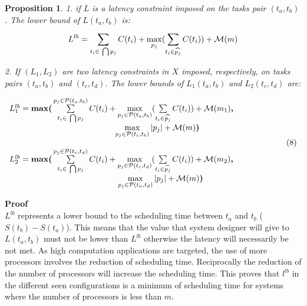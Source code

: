 \documentclass{ijcaArticle}
\newtheorem{Proposition}{Proposition}
\begin{document}
 \begin{Proposition}\label{lower_bound}
1.  if $L$ is a latency constraint imposed on the tasks pair $(t_{a},t_{b})$. The lower bound of $L(t_{a}, t_{b})$  is: 
\begin{equation}\label{eq_clus_sim_cond_multi_4} 
L^{l b}= \sum\limits_{t_i \in \ \bigcap p_j }^{} C(t_i) +  \max\limits_{{p_j}}(\sum\limits_{t_i \in \widehat{p_j}}^{} C(t_i)) + { \cal M}(m) 
\end{equation}

2. If $(L_1,L_2)$ are two latency constraints in $X$ imposed, respectively, on tasks pairs $(t_{a},t_{b})$ and $(t_{c},t_{d})$. The lower bounds of $L_1(t_{a}, t_{b})$  and $L_2(t_{c}, t_{d})$ are:


 \begin{eqnarray}\nonumber \label{lb}
 \begin{array}{l}        
L_{1}^{l b}= \boldsymbol{\max (}\sum\limits_{t_i \in \ \bigcap p_j }^{p_j \in {\cal P}(t_a,t_b)} C(t_i) +  \max\limits_{p_j \in {\cal P}(t_a,t_b)}^{} (\sum\limits_{t_i \in \widehat{p_j}}^{} C(t_i)) + { \cal M}(m_1) \boldsymbol{,} 
\\ \ \ \ \ \ \ \ \ \ \ \ \ \ \ \ \ \ \ \ \ \ \ \ \ \ \ \ \ \ \ \ \ \ \ \ \ \ \ \ \max\limits_{p_j \in  {\cal P}(t_c,t_b)} |p_j| +  {\cal M}(m)\boldsymbol{)}   \\   
\ \ \ \ \ \ \ \ \ \ \ \ \ \ \ \ \ \ \ \ \ \ \ \ \ \ \ \ \ \ \ \ \ \ \ \ \ \ \ \ \ \ \ \ \ \ \ \ \ \ \ \ \ \ \ \ \ \ \ \ \ \ \   \ \ \ \ \ \ \ \ \ \ \ \ \ \ \ \ \ \ \ \ \ \ \ \ \ \ \ \ \ \ \ \ \ \ \ \ \ \ \   (8)\\
 L_{2}^{l b}=  \boldsymbol{\max (}\sum\limits_{t_i \in \ \bigcap p_j }^{p_j \in {\cal P}(t_c,t_d)} C(t_i) +  \max\limits_{p_j\in {\cal P}(t_c,t_d)}^{}(\sum\limits_{t_i \in \widehat{p_j}}^{} C(t_i)) + { \cal M}(m_2)\boldsymbol{,} 
 \\   \ \ \ \ \ \ \ \ \ \ \ \ \ \ \ \ \ \ \ \ \ \ \ \ \ \ \ \ \ \ \ \ \ \ \ \ \ \ \ \  \max\limits_{p_j \in {\cal P}(t_a,t_d)} |p_j|  +   {\cal M}(m)\boldsymbol{)}  
 \end{array} 
\end{eqnarray}
\end{Proposition}
 
\textbf{Proof} \\
$L^{l b}$ represents a lower bound to the scheduling time between $t_a$ and $t_b$ ($S(t_b)-S(t_a)$). This means that the value that system designer will give to $L(t_{a}, t_{b})$ must not be lower than $L^{l b}$ otherwise the latency will necessarily be not met.  As high computation applications are targeted, the use of more processors involves the reduction of scheduling time. Reciprocally the reduction of the number of processors will increase the scheduling time. This proves that $l^{lb}$ in the different seen configurations is a minimum of scheduling time
for systems where the number of processors is less than $m$. 
\end{document}
